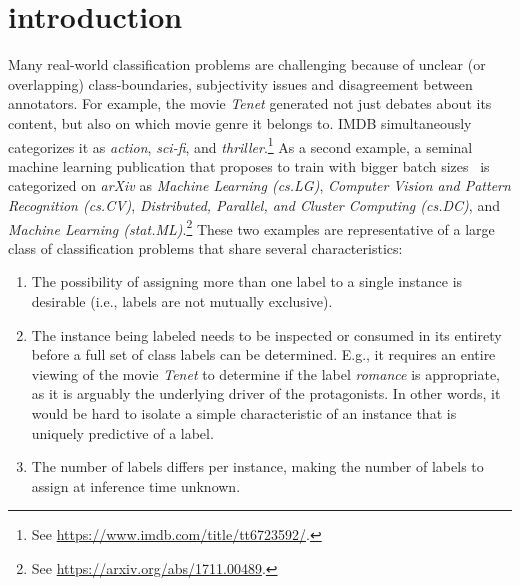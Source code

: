 
\section{introduction}
\label{sec:org662677c}


Many real-world classification problems are challenging because of unclear (or overlapping) class-boundaries, subjectivity issues and disagreement between annotators. 
For example, the movie \textit{Tenet} generated not just debates about its content, but also on which movie genre it belongs to. IMDB simultaneously categorizes it as \textit{action}, \textit{sci-fi}, and \textit{thriller}.\footnote{See \url{https://www.imdb.com/title/tt6723592/}.} 
As a second example, a seminal machine learning publication that proposes to train with bigger batch sizes~\citep{bigBSArxiv} is categorized on \textit{arXiv} as \textit{Machine Learning (cs.LG)},
\textit{Computer Vision and Pattern Recognition (cs.CV)}, \textit{Distributed,
Parallel, and Cluster Computing (cs.DC)}, and \textit{Machine Learning
(stat.ML)}.\footnote{See \url{https://arxiv.org/abs/1711.00489}.}
These two examples are representative of a large class of classification problems that share several characteristics: 
\begin{enumerate}[label=(\arabic*),leftmargin=*]
\item The possibility of assigning more than one label to a single instance is desirable (i.e., labels are not mutually exclusive). 
\item The instance being labeled needs to be inspected or consumed in its entirety before a full set of class labels can be determined. E.g., it requires an entire viewing of the movie \textit{Tenet} to determine if the label \textit{romance} is appropriate, as it is arguably the underlying driver of the protagonists. In other words, it would be hard to isolate a simple characteristic of an instance that is uniquely predictive of a label.
\item The number of labels differs per instance, making the number of labels to assign at inference time unknown.
\end{enumerate}

